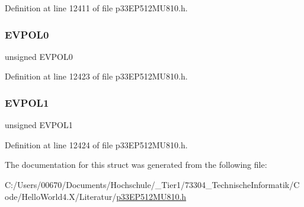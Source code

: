 Definition at line 12411 of file p33\+E\+P512\+M\+U810.\+h.

\mbox{\label{structtag_c_m2_c_o_n_b_i_t_s_ab8a5977706a1608b0e9a1a91b9d3b3e3}} 
\subsubsection{\texorpdfstring{E\+V\+P\+O\+L0}{EVPOL0}}
{\footnotesize\ttfamily unsigned E\+V\+P\+O\+L0}



Definition at line 12423 of file p33\+E\+P512\+M\+U810.\+h.

\mbox{\label{structtag_c_m2_c_o_n_b_i_t_s_a0254aea1902c8c590f6753fefd1d8875}} 
\subsubsection{\texorpdfstring{E\+V\+P\+O\+L1}{EVPOL1}}
{\footnotesize\ttfamily unsigned E\+V\+P\+O\+L1}



Definition at line 12424 of file p33\+E\+P512\+M\+U810.\+h.



The documentation for this struct was generated from the following file\+:\begin{DoxyCompactItemize}
\item 
C\+:/\+Users/00670/\+Documents/\+Hochschule/\+\_\+\+Tier1/73304\+\_\+\+Technische\+Informatik/\+Code/\+Hello\+World4.\+X/\+Literatur/\hyperlink{p33_e_p512_m_u810_8h}{p33\+E\+P512\+M\+U810.\+h}\end{DoxyCompactItemize}
